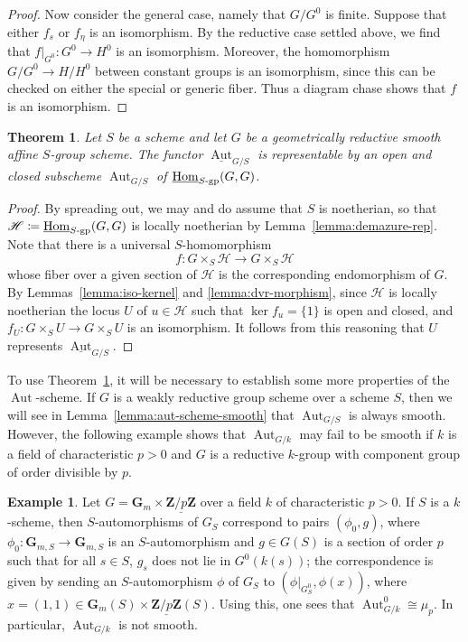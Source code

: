 \documentclass[11pt, letterpaper,english]{amsart}
\theoremstyle{plain}
\newtheorem{theorem}[lem]{Theorem}
\theoremstyle{definition}
\newtheorem{example}[lem]{Example}
\numberwithin{equation}{section}
\numberwithin{lem}{section}
\newcommand{\mathfont}{\mathbf}
\newcommand{\bG}{\mathfont{G}}
\newcommand{\bZ}{\mathfont{Z}}
\DeclareMathOperator{\Hom}{Hom}
\DeclareMathOperator{\Aut}{Aut}
\begin{document}
\begin{proof}
Now consider the general case, namely that $G/G^0$ is finite. Suppose that either $f_s$ or $f_\eta$ is an isomorphism. By the reductive case settled above, we find that $f|_{G^0}: G^0 \to H^0$ is an isomorphism. Moreover, the homomorphism $G/G^0 \to H/H^0$ between constant groups is an isomorphism, since this can be checked on either the special or generic fiber. Thus a diagram chase shows that $f$ is an isomorphism.
\end{proof}

\begin{theorem}\label{theorem:aut-scheme}
Let $S$ be a scheme and let $G$ be a geometrically reductive smooth affine $S$-group scheme. The functor $\underline{\Aut}_{G/S}$ is representable by an open and closed subscheme $\Aut_{G/S}$ of $\underline{\Hom}_{S\textrm{-}\rm{gp}}(G, G)$.
\end{theorem}

\begin{proof}
By spreading out, we may and do assume that $S$ is noetherian, so that $\mathscr{H} \coloneqq \underline{\Hom}_{S\textrm{-}\rm{gp}}(G, G)$ is locally noetherian by Lemma~\ref{lemma:demazure-rep}. Note that there is a universal $S$-homomorphism  
\[
f: G \times_S \mathscr{H} \to G \times_S \mathscr{H}
\]
whose fiber over a given section of $\mathscr{H}$ is the corresponding endomorphism of $G$. By Lemmas~\ref{lemma:iso-kernel} and \ref{lemma:dvr-morphism}, since $\mathscr{H}$ is locally noetherian the locus $U$ of $u \in \mathscr{H}$ such that $\ker f_u = \{1\}$ is open and closed, and $f_U: G \times_S U \to G \times_S U$ is an isomorphism. It follows from this reasoning that $U$ represents $\underline{\Aut}_{G/S}$.
\end{proof}

To use Theorem~\ref{theorem:aut-scheme}, it will be necessary to establish some more properties of the $\Aut$-scheme. If $G$ is a weakly reductive group scheme over a scheme $S$, then we will see in Lemma~\ref{lemma:aut-scheme-smooth} that $\Aut_{G/S}$ is always smooth. However, the following example shows that $\Aut_{G/k}$ may fail to be smooth if $k$ is a field of characteristic $p > 0$ and $G$ is a reductive $k$-group with component group of order divisible by $p$.

\begin{example}\label{example:non-smooth-aut}
Let $G = \bG_m \times \underline{\bZ/p \bZ}$ over a field $k$ of characteristic $p > 0$. If $S$ is a $k$-scheme, then $S$-automorphisms of $G_S$ correspond to pairs $(\phi_0, g)$, where $\phi_0: \bG_{m, S} \to \bG_{m, S}$ is an $S$-automorphism and $g \in G(S)$ is a section of order $p$ such that for all $s \in S$, $g_s$ does not lie in $G^0(k(s))$; the correspondence is given by sending an $S$-automorphism $\phi$ of $G_S$ to $(\phi|_{G_S^0}, \phi(x))$, where $x = (1, 1) \in \bG_m(S) \times \underline{\bZ/p \bZ}(S)$. Using this, one sees that $\Aut_{G/k}^0 \cong \mu_p$. In particular, $\Aut_{G/k}$ is not smooth.
\end{example}
\end{document}

